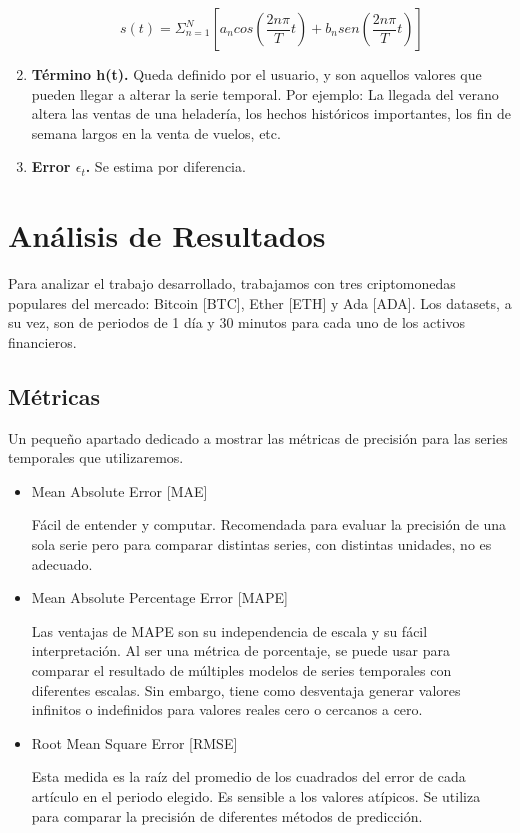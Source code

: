 \documentclass[a4paper,10pt]{article}
\begin{document}
\begin{enumerate}
 \begin{equation}
  s(t) = \Sigma_{n=1}^N [a_n cos(\frac{2n\pi}{T}t) + b_n sen (\frac{2n\pi}{T}t) ]
 \end{equation}


 \item \textbf{Término h(t).} Queda definido por el usuario, y son aquellos valores que pueden llegar a alterar la serie temporal. Por ejemplo: La llegada del verano altera las ventas de una heladería, los hechos históricos importantes, los fin de semana largos en la venta de vuelos, etc.

 \item \textbf{Error $\epsilon_t$.} Se estima por diferencia.

\end{enumerate}







\section{Análisis de Resultados}

Para analizar el trabajo desarrollado, trabajamos con tres criptomonedas populares del mercado: Bitcoin [BTC], Ether [ETH] y Ada [ADA]. Los datasets, a su vez, son de periodos de 1 día y 30 minutos para cada uno de los activos financieros.

\subsection{Métricas}

Un pequeño apartado dedicado a mostrar las métricas de precisión para las series temporales que utilizaremos.

\begin{itemize}

\item Mean Absolute Error [MAE]

Fácil de entender y computar. Recomendada para evaluar la precisión de una sola serie pero para comparar distintas series, con distintas unidades, no es adecuado.


\item Mean Absolute Percentage Error [MAPE]

Las ventajas de MAPE son su independencia de escala y su fácil interpretación. Al ser una métrica de porcentaje, se puede usar para comparar el resultado de múltiples modelos de series temporales con diferentes escalas. Sin embargo, tiene como desventaja generar valores infinitos o indefinidos para valores reales cero o cercanos a cero.

\item Root Mean Square Error [RMSE]

Esta  medida  es la  raíz  del  promedio  de  los cuadrados del error de cada artículo en el periodo elegido. Es sensible a los valores atípicos. Se utiliza para comparar la precisión de diferentes métodos de predicción.

\end{itemize}
\end{document}

